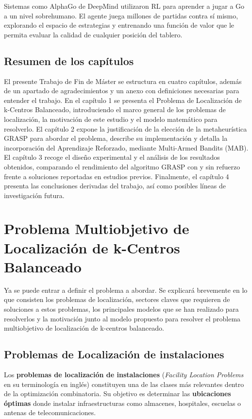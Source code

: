 \documentclass[12pt,a4paper]{book}
\begin{document}
Sistemas como AlphaGo \cite{AlphaGo} de DeepMind utilizaron RL para aprender a jugar a Go a un nivel sobrehumano.
El agente juega millones de partidas contra sí mismo, explorando el espacio de estrategias y entrenando una función de valor que le permita evaluar la calidad de cualquier posición del tablero.


\section{Resumen de los capítulos}
El presente Trabajo de Fin de Máster se estructura en cuatro capítulos, además de un apartado de agradecimientos y un anexo con definiciones necesarias para entender el trabajo.
En el capítulo 1 se presenta el Problema de Localización de k-Centros Balanceado, introduciendo el marco general de los problemas de localización, la motivación de este estudio y el modelo matemático para resolverlo.
El capítulo 2 expone la justificación de la elección de la metaheurística GRASP para abordar el problema, describe su implementación y detalla la incorporación del Aprendizaje Reforzado, mediante Multi-Armed Bandits (MAB).
El capítulo 3 recoge el diseño experimental y el análisis de los resultados obtenidos, comparando el rendimiento del algoritmo GRASP con y sin refuerzo frente a soluciones reportadas en estudios previos.
Finalmente, el capítulo 4 presenta las conclusiones derivadas del trabajo, así como posibles líneas de investigación futura.

\chapter{Problema Multiobjetivo de Localización de k-Centros Balanceado}

Ya se puede entrar a definir el problema a abordar. Se explicará brevemente en lo que consisten los problemas de localización, sectores claves que requieren de soluciones a 
estos problemas, los principales modelos que se han realizado para resolverlos y la motivación junto al modelo propuesto para resolver el problema multiobjetivo de localización de k-centros balanceado.

\section{Problemas de Localización de instalaciones}

Los \textbf{problemas de localización de instalaciones} (\textit{Facility Location Problems} en su terminología en inglés) constituyen una de las clases más relevantes dentro de la optimización combinatoria. Su objetivo es determinar las \textbf{ubicaciones óptimas} donde instalar infraestructuras como almacenes, hospitales, escuelas o antenas de telecomunicaciones.
\end{document}
